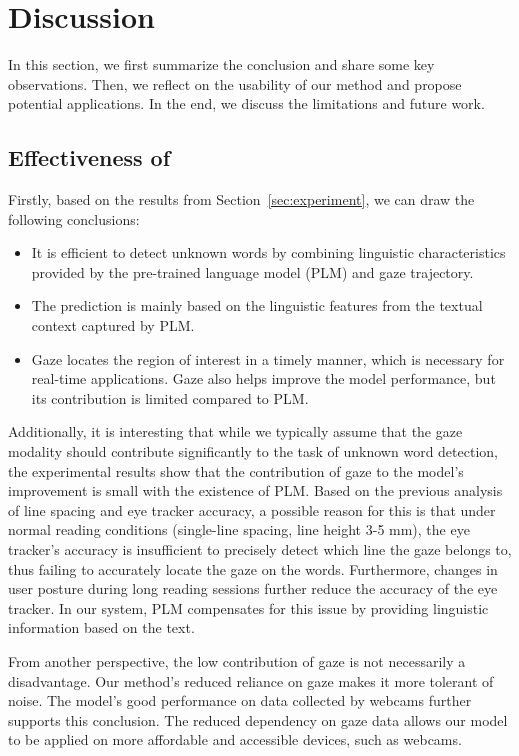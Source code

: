 \section{Discussion}
\label{sec:discussion}

In this section, we first summarize the conclusion and share some key observations. Then, we reflect on the usability of our method and propose potential applications. In the end, we discuss the limitations and future work.

\subsection{Effectiveness of \name{}}
\label{sec:discuss_effectiveness}
Firstly, based on the results from Section~\ref{sec:experiment}, we can draw the following conclusions:
\begin{itemize}
    \item It is efficient to detect unknown words by combining linguistic characteristics provided by the pre-trained language model (PLM) and gaze trajectory.
    \item The prediction is mainly based on the linguistic features from the textual context captured by PLM.
    \item Gaze locates the region of interest in a timely manner, which is necessary for real-time applications. Gaze also helps improve the model performance, but its contribution is limited compared to PLM.
\end{itemize}

Additionally, it is interesting that while we typically assume that the gaze modality should contribute significantly to the task of unknown word detection, the experimental results show that the contribution of gaze to the model’s improvement is small with the existence of PLM. Based on the previous analysis of line spacing and eye tracker accuracy, a possible reason for this is that under normal reading conditions (single-line spacing, line height 3-5 mm), the eye tracker’s accuracy is insufficient to precisely detect which line the gaze belongs to, thus failing to accurately locate the gaze on the words. Furthermore, changes in user posture during long reading sessions further reduce the accuracy of the eye tracker. In our system, PLM compensates for this issue by providing linguistic information based on the text.

From another perspective, the low contribution of gaze is not necessarily a disadvantage. Our method’s reduced reliance on gaze makes it more tolerant of noise. The model’s good performance on data collected by webcams further supports this conclusion. The reduced dependency on gaze data allows our model to be applied on more affordable and accessible devices, such as webcams.

